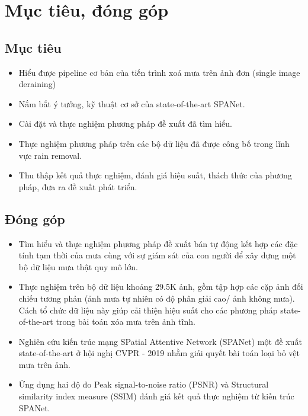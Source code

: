 \section{Mục tiêu, đóng góp}
\subsection{Mục tiêu}
\begin{itemize}
    \item Hiểu được pipeline cơ bản của tiến trình xoá mưa trên ảnh đơn (single image deraining)
    \item Nắm bắt ý tưởng, kỹ thuật cơ sở của state-of-the-art SPANet.
    \item Cài đặt và thực nghiệm phương pháp đề xuất đã tìm hiểu.
    \item Thực nghiệm phương pháp trên các bộ dữ liệu đã được công bố trong lĩnh vực rain removal.
    \item Thu thập kết quả thực nghiệm, đánh giá hiệu suất, thách thức của phương pháp, đưa ra đề xuất phát triển.
\end{itemize}

\subsection{Đóng góp}
\begin{itemize}
    \item Tìm hiểu và thực nghiệm phương pháp đề xuất bán tự động kết hợp các đặc tính tạm thời của mưa cùng với sự giám sát của con người để xây dựng một bộ dữ liệu mưa thật quy mô lớn.
    \item Thực nghiệm trên bộ dữ liệu khoảng 29.5K ảnh, gồm tập hợp các cặp ảnh đối chiếu tương phản (ảnh mưa tự nhiên có độ phân giải cao/ ảnh không mưa). Cách tổ chức dữ liệu này giúp cải thiện hiệu suất cho các phương pháp state-of-the-art trong bài toán xóa mưa trên ảnh tĩnh.
    \item Nghiên cứu kiến trúc mạng SPatial Attentive Network (SPANet) một đề xuất state-of-the-art ở hội nghị CVPR - 2019 nhằm giải quyết bài toán loại bỏ vệt mưa trên ảnh.
    \item Ứng dụng hai độ đo Peak signal-to-noise ratio (PSNR) và Structural similarity index measure (SSIM) đánh giá kết quả thực nghiệm từ kiến trúc SPANet.
\end{itemize}

\clearpage
